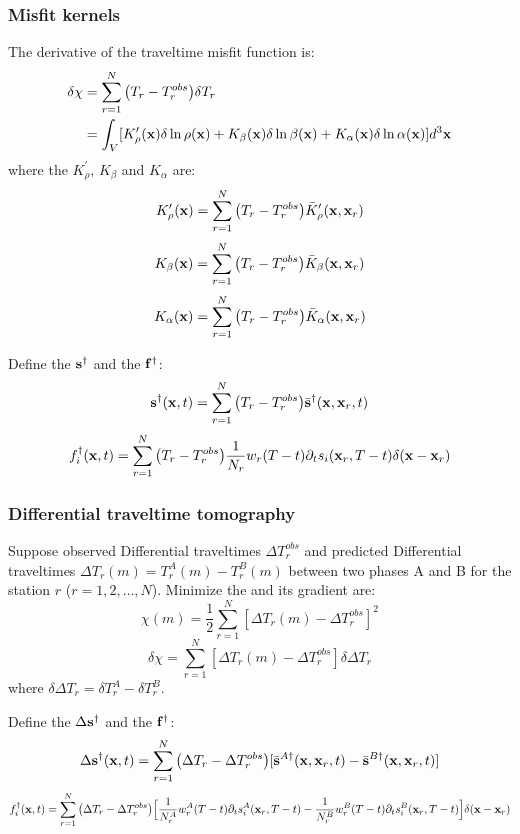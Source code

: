 \subsubsection{Misfit kernels}
The \Frechet derivative of the traveltime misfit function is:
\begin{align*}
  \delta\chi & =\sum_{r=1}^N\big(T_r-T_r^{obs}\big)\delta T_r \\
    & =\int_V[K_\rho^\prime(\mathbf{x})\delta\ln\rho(\mathbf{x})+K_\beta(\mathbf{x})\delta\ln\beta(\mathbf{x})+K_\alpha(\mathbf{x})\delta\ln\alpha(\mathbf{x})]d^3\mathbf{x}
\end{align*}
where the  $K_\rho^\prime$, $K_\beta$ and $K_\alpha$ are:
\[ K_\rho^\prime(\mathbf{x})=\sum_{r=1}^N\big(T_r-T_r^{obs}\big)\bar K_\rho^\prime(\mathbf{x},\mathbf{x}_r) \]
\[ K_\beta(\mathbf{x})=\sum_{r=1}^N\big(T_r-T_r^{obs}\big)\bar K_\beta(\mathbf{x},\mathbf{x}_r) \]
\[ K_\alpha(\mathbf{x})=\sum_{r=1}^N\big(T_r-T_r^{obs}\big)\bar K_\alpha(\mathbf{x},\mathbf{x}_r) \]\par
Define the  $\mathbf{s}^\dagger$ and the  $\mathbf{f}^\dagger$:
\[ \mathbf{s}^\dagger(\mathbf{x},t)=\sum_{r=1}^N\big(T_r-T_r^{obs}\big)\bar{\mathbf{s}}^\dagger(\mathbf{x},\mathbf{x}_r,t) \]
\[ f_i^\dagger(\mathbf{x},t)=\sum_{r=1}^N\big(T_r-T_r^{obs}\big)\frac{1}{N_r}w_r(T-t)\partial_ts_i(\mathbf{x}_r,T-t)\delta(\mathbf{x}-\mathbf{x}_r) \]\par
\subsubsection{Differential traveltime tomography}
Suppose observed Differential traveltimes $\Delta T_r^{obs}$ and predicted Differential traveltimes $\Delta T_r(m)=T_r^A(m)-T_r^B(m)$ between two phases A and B for the station $r$ ($r=1,2,\ldots,N$). Minimize the  and its gradient are:
\[ \chi(m)=\frac{1}{2}\sum_{r=1}^N[\Delta T_r(m)-\Delta T_r^{obs}]^2 \]
\[ \delta\chi=\sum_{r=1}^N[\Delta T_r(m)-\Delta T_r^{obs}]\delta\Delta T_r \]
where $\delta\Delta T_r=\delta T_r^A-\delta T_r^B$.\par
Define the  $\Delta\mathbf{s}^\dagger$ and the  $\mathbf{f}^\dagger$:
\[ \Delta\mathbf{s}^\dagger(\mathbf{x},t)=\sum_{r=1}^N\big(\Delta T_r-\Delta T_r^{obs}\big)[\bar{\mathbf{s}}^{A\dagger}(\mathbf{x},\mathbf{x}_r,t)-\bar{\mathbf{s}}^{B\dagger}(\mathbf{x},\mathbf{x}_r,t)] \]
\[ f_i^\dagger(\mathbf{x},t)=\sum_{r=1}^N\big(\Delta T_r-\Delta T_r^{obs}\big)\Big[\frac{1}{N_r^A}w_r^A(T-t)\partial_ts_i^A(\mathbf{x}_r,T-t)-\frac{1}{N_r^B}w_r^B(T-t)\partial_ts_i^B(\mathbf{x}_r,T-t)\Big]\delta(\mathbf{x}-\mathbf{x}_r) \]\par
